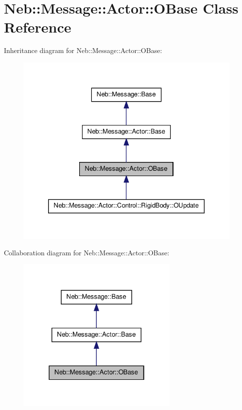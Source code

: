 \hypertarget{classNeb_1_1Message_1_1Actor_1_1OBase}{\section{\-Neb\-:\-:\-Message\-:\-:\-Actor\-:\-:\-O\-Base \-Class \-Reference}
\label{classNeb_1_1Message_1_1Actor_1_1OBase}
}


\-Inheritance diagram for \-Neb\-:\-:\-Message\-:\-:\-Actor\-:\-:\-O\-Base\-:\nopagebreak
\begin{figure}[H]
\begin{center}
\leavevmode
\includegraphics[width=322pt]{classNeb_1_1Message_1_1Actor_1_1OBase__inherit__graph}
\end{center}
\end{figure}


\-Collaboration diagram for \-Neb\-:\-:\-Message\-:\-:\-Actor\-:\-:\-O\-Base\-:\nopagebreak
\begin{figure}[H]
\begin{center}
\leavevmode
\includegraphics[width=226pt]{classNeb_1_1Message_1_1Actor_1_1OBase__coll__graph}
\end{center}
\end{figure}

